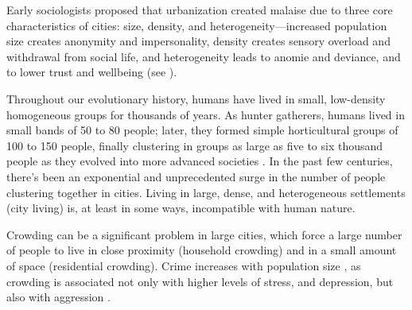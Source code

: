 \documentclass[11pt, letterpaper]{article}
\begin{document}
\begin{spacing}{1.4}
Early sociologists proposed that urbanization created malaise due to three core characteristics of cities: size, density, and heterogeneity---increased population size creates anonymity and
 impersonality, density creates sensory overload and withdrawal from social
 life, and heterogeneity leads to anomie and deviance, and to lower trust and wellbeing (see \citet{park84,
   simmel03, tonnies57, wirth38,putnam07,aok_brfss_segregation15,herbst14,postmes02,vogt07,smelser99}).
%

Throughout our evolutionary history, humans have lived in small, low-density
homogeneous groups for thousands of years. As hunter gatherers, humans lived in small bands of 50 to 80
people; later, they formed simple horticultural groups of 100 to 150 people,
finally clustering in groups as large as five to six thousand people as they
evolved into more advanced societies \citep{maryanski92}. In the past few centuries, 
there's been an exponential and unprecedented surge in the number of people clustering together in cities.
Living in large,
dense, and heterogeneous settlements (city living) is, at least in some ways, incompatible with human nature.

%
Crowding can be a significant problem in large cities, which force a large number of people to live in close proximity (household crowding) and in a small amount of space (residential crowding). Crime increases with population size \citep{bettencourt10b}, as crowding is associated not only with higher levels of stress, and depression, but also with aggression \citep{regoeczi2008,calhoun62}. 


\end{spacing}
\end{document}
